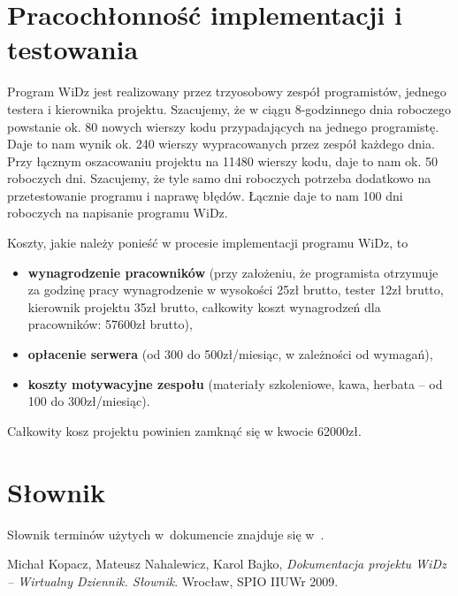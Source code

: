 \documentclass[12pt,leqno,twoside]{mwart}
\begin{document}
\section{Pracochłonność implementacji i testowania}
\noindent Program WiDz jest realizowany przez trzyosobowy zespół programistów, jednego testera i kierownika projektu. Szacujemy, że w ciągu 8-godzinnego dnia roboczego powstanie ok. 80 nowych wierszy kodu przypadających na jednego programistę. Daje to nam wynik ok. 240 wierszy wypracowanych przez zespół każdego dnia. Przy łącznym oszacowaniu projektu na 11480 wierszy kodu, daje to nam ok. 50 roboczych dni. Szacujemy, że tyle samo dni roboczych potrzeba dodatkowo na przetestowanie programu i naprawę błędów. Łącznie daje to nam 100 dni roboczych na napisanie programu WiDz.

Koszty, jakie należy ponieść w procesie implementacji programu WiDz, to
\begin{itemize}
\item \textbf{wynagrodzenie pracowników} (przy założeniu, że programista otrzymuje za godzinę pracy wynagrodzenie w wysokości 25zł brutto, tester 12zł brutto, kierownik projektu 35zł brutto, całkowity koszt wynagrodzeń dla pracowników: 57600zł brutto),
\item \textbf{opłacenie serwera} (od 300 do 500zł/miesiąc, w zależności od wymagań),
\item \textbf{koszty motywacyjne zespołu} (materiały szkoleniowe, kawa, herbata -- od 100 do 300zł/miesiąc).
\end{itemize}
Całkowity kosz projektu powinien zamknąć się w kwocie 62000zł.

\section{Słownik}
\noindent Słownik terminów użytych w~dokumencie znajduje się w~\cite{SLO}.

\begin{thebibliography}{99}
 Michał Kopacz, Mateusz Nahalewicz, Karol Bajko, {\it Dokumentacja projektu WiDz -- Wirtualny Dziennik. Słownik}. Wrocław, SPIO IIUWr 2009.
\end{thebibliography}
\end{document}
